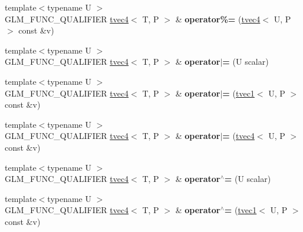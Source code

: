 \begin{DoxyCompactItemize}
\item 
\mbox{\label{structglm_1_1tvec4_a03faa16c94b7cb1e2082aebede1451c2}} 
{\footnotesize template$<$typename U $>$ }\\G\+L\+M\+\_\+\+F\+U\+N\+C\+\_\+\+Q\+U\+A\+L\+I\+F\+I\+ER \hyperlink{structglm_1_1tvec4}{tvec4}$<$ T, P $>$ \& {\bfseries operator\%=} (\hyperlink{structglm_1_1tvec4}{tvec4}$<$ U, P $>$ const \&v)
\item 
\mbox{\label{structglm_1_1tvec4_ae8690e557100d8299871ab1809e5dea7}} 
{\footnotesize template$<$typename U $>$ }\\G\+L\+M\+\_\+\+F\+U\+N\+C\+\_\+\+Q\+U\+A\+L\+I\+F\+I\+ER \hyperlink{structglm_1_1tvec4}{tvec4}$<$ T, P $>$ \& {\bfseries operator$\vert$=} (U scalar)
\item 
\mbox{\label{structglm_1_1tvec4_a8f18846441fd6ad08154311274a37fd8}} 
{\footnotesize template$<$typename U $>$ }\\G\+L\+M\+\_\+\+F\+U\+N\+C\+\_\+\+Q\+U\+A\+L\+I\+F\+I\+ER \hyperlink{structglm_1_1tvec4}{tvec4}$<$ T, P $>$ \& {\bfseries operator$\vert$=} (\hyperlink{structglm_1_1tvec1}{tvec1}$<$ U, P $>$ const \&v)
\item 
\mbox{\label{structglm_1_1tvec4_aabde2042533b8cf0b03d1e75de75d910}} 
{\footnotesize template$<$typename U $>$ }\\G\+L\+M\+\_\+\+F\+U\+N\+C\+\_\+\+Q\+U\+A\+L\+I\+F\+I\+ER \hyperlink{structglm_1_1tvec4}{tvec4}$<$ T, P $>$ \& {\bfseries operator$\vert$=} (\hyperlink{structglm_1_1tvec4}{tvec4}$<$ U, P $>$ const \&v)
\item 
\mbox{\label{structglm_1_1tvec4_a7866bb2f3c4496c7b216f4d9c74b6bf7}} 
{\footnotesize template$<$typename U $>$ }\\G\+L\+M\+\_\+\+F\+U\+N\+C\+\_\+\+Q\+U\+A\+L\+I\+F\+I\+ER \hyperlink{structglm_1_1tvec4}{tvec4}$<$ T, P $>$ \& {\bfseries operator$^\wedge$=} (U scalar)
\item 
\mbox{\label{structglm_1_1tvec4_aeb460e85abbffbc0880712c2a32659a1}} 
{\footnotesize template$<$typename U $>$ }\\G\+L\+M\+\_\+\+F\+U\+N\+C\+\_\+\+Q\+U\+A\+L\+I\+F\+I\+ER \hyperlink{structglm_1_1tvec4}{tvec4}$<$ T, P $>$ \& {\bfseries operator$^\wedge$=} (\hyperlink{structglm_1_1tvec1}{tvec1}$<$ U, P $>$ const \&v)

\end{DoxyCompactItemize}
